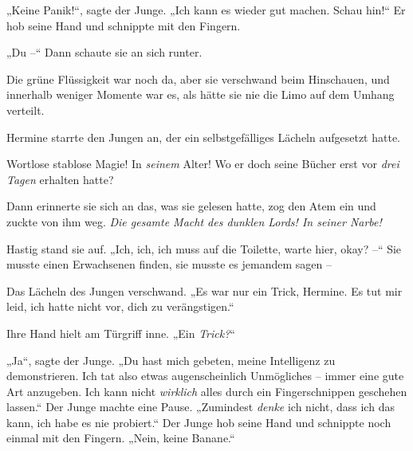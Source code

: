 „Keine Panik!“, sagte der Junge. „Ich kann es wieder gut machen. Schau hin!“ Er hob seine Hand und schnippte mit den Fingern.

„Du –“ Dann schaute sie an sich runter.

Die grüne Flüssigkeit war noch da, aber sie verschwand beim Hinschauen, und innerhalb weniger Momente war es, als hätte sie nie die Limo auf dem Umhang verteilt.

Hermine starrte den Jungen an, der ein selbstgefälliges Lächeln aufgesetzt hatte.

Wortlose stablose Magie! In \emph{seinem} Alter! Wo er doch seine Bücher erst vor \emph{drei Tagen} erhalten hatte?

Dann erinnerte sie sich an das, was sie gelesen hatte, zog den Atem ein und zuckte von ihm weg. \emph{Die gesamte Macht des dunklen Lords! In seiner Narbe!}

Hastig stand sie auf. „Ich, ich, ich muss auf die Toilette, warte hier, okay? –“ Sie musste einen Erwachsenen finden, sie musste es jemandem sagen –

Das Lächeln des Jungen verschwand. „Es war nur ein Trick, Hermine. Es tut mir leid, ich hatte nicht vor, dich zu verängstigen.“

Ihre Hand hielt am Türgriff inne. „Ein \emph{Trick?}“

„Ja“, sagte der Junge. „Du hast mich gebeten, meine Intelligenz zu demonstrieren. Ich tat also etwas augenscheinlich Unmögliches – immer eine gute Art anzugeben. Ich kann nicht \emph{wirklich} alles durch ein Fingerschnippen geschehen lassen.“ Der Junge machte eine Pause. „Zumindest \emph{denke} ich nicht, dass ich das kann, ich habe es nie probiert.“ Der Junge hob seine Hand und schnippte noch einmal mit den Fingern. „Nein, keine Banane.“

